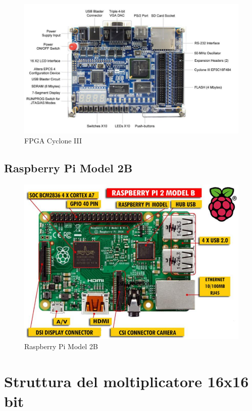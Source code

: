 \documentclass[titlepage]{report}
\begin{document}
		\begin{figure}[ht!]
			\centering
			\includegraphics[scale=0.7]{./img/fpga_cycloneIII.pdf}
			\caption[FPGA]{FPGA Cyclone III}
			\label{fig:FPGA_cycloneIII}
		\end{figure}

	\section{Raspberry Pi Model 2B}
	\label{sec:raspi_model2b}

		\begin{figure}[ht!]
			\centering
			\includegraphics[scale=0.6]{./img/rapi2b.png}
			\caption[Raspi]{Raspberry Pi Model 2B}
			\label{fig:raspi_model2b}
		\end{figure}

\chapter*{Struttura del moltiplicatore 16x16 bit}
\label{ch:struttura_moltiplicatore}
\end{document}
